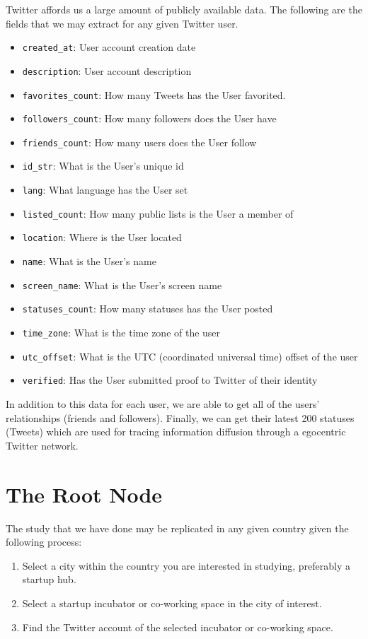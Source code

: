 Twitter affords us a large amount of publicly available data. The
following are the fields that we may extract for any given Twitter
user.

\begin{itemize}
\item \verb|created_at|: User account creation date
\item \verb|description|: User account description
\item \verb|favorites_count|: How many Tweets has the User favorited.
\item \verb|followers_count|: How many followers does the User have
\item \verb|friends_count|: How many users does the User follow
\item \verb|id_str|: What is the User's unique id
\item \verb|lang|: What language has the User set
\item \verb|listed_count|: How many public lists is the User a member of
\item \verb|location|: Where is the User located
\item \verb|name|: What is the User's name
\item \verb|screen_name|: What is the User's screen name
\item \verb|statuses_count|: How many statuses has the User posted
\item \verb|time_zone|: What is the time zone of the user
\item \verb|utc_offset|: What is the UTC (coordinated universal time) offset of the user
\item \verb|verified|: Has the User submitted proof to Twitter of their identity
\end{itemize}

In addition to this data for each user, we are able to get all of the
users' relationships (friends and followers). Finally, we can get
their latest 200 statuses (Tweets) which are used for tracing
information diffusion through a egocentric Twitter network.

\section{The Root Node}
The study that we have done may be replicated in any given country
given the following process:

\begin{enumerate}
\item Select a city within the country you are interested in studying,
  preferably a startup hub.
\item Select a startup incubator or co-working space in the city of
  interest.
\item Find the Twitter account of the selected incubator or co-working
  space.
\end{enumerate}

